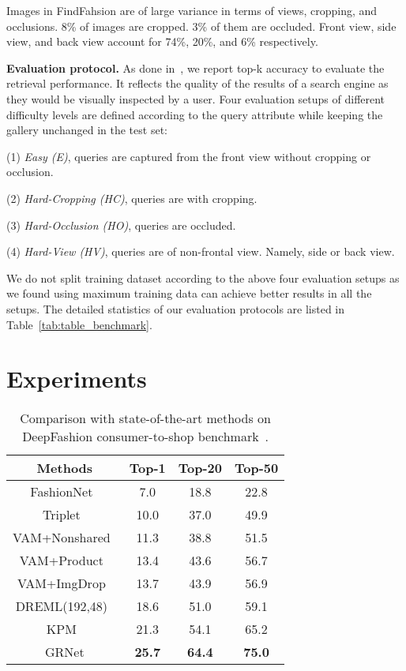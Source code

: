 \documentclass[10pt,twocolumn,letterpaper]{article}
\begin{document}
Images in FindFahsion are of large variance in terms of views, cropping, and occlusions. 8\% of images are cropped. 3\% of them are occluded. Front view, side view, and back view account for 74\%, 20\%, and 6\% respectively.


\textbf{Evaluation protocol.}
As done in~\cite{Liu2016}, we report top-k accuracy to evaluate the retrieval performance. It reflects the quality of the results of a search engine as they would be visually inspected by a user. Four evaluation setups of different difficulty levels are defined according to the query attribute while keeping the gallery unchanged in the test set:


(1) \textit{Easy (E)}, queries are captured from the front view without cropping or occlusion.

(2) \textit{Hard-Cropping (HC)}, queries are with cropping.

(3) \textit{Hard-Occlusion (HO)}, queries are occluded.

(4) \textit{Hard-View (HV)}, queries are of non-frontal view. Namely, side or back view.

We do not split training dataset according to the above four evaluation setups as we found using maximum training data can achieve better results in all the setups. The detailed statistics of our evaluation protocols are listed in Table~\ref{tab:table_benchmark}.

\section{Experiments}
\begin{table}
\footnotesize
\center
\begin{center}
\begin{tabular}{c
|c|c|c
}
\hline
Methods &Top-1&Top-20&Top-50  \\ \hline
FashionNet~\cite{Liu2016}&7.0 &18.8 &22.8    \\ \hline
Triplet~\cite{Wang2018b}&10.0 &37.0 &49.9       \\ \hline
VAM+Nonshared~\cite{Wang2018b}&11.3 &38.8 &51.5 \\ \hline
VAM+Product~\cite{Wang2018b}&13.4 &43.6 &56.7 \\ \hline
VAM+ImgDrop~\cite{Wang2018b}&13.7 &43.9 &56.9 \\ \hline
DREML(192,48)~\cite{Xuan2018} &18.6 &51.0 &59.1          \\ \hline
KPM~\cite{Shen_2018_CVPR} &21.3 &54.1 &65.2           \\ \hline
GRNet&\textbf{25.7} &\textbf{64.4} &\textbf{75.0}           \\ \hline
\end{tabular}
\end{center}
\caption{Comparison with state-of-the-art methods on DeepFashion consumer-to-shop benchmark~\cite{Liu2016}.}
\label{tab:com_DeepFashion}
\end{table}
\end{document}

